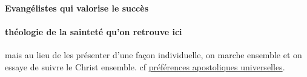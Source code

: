 \paragraph{Evangélistes qui valorise le succès}

\paragraph{théologie de la sainteté qu'on retrouve ici} mais au lieu de les présenter d'une façon individuelle, on marche ensemble et on essaye de suivre le Christ ensemble. cf \href{https://www.jesuites.com/quatre-preferences-apostoliques-universelles-jesuites-dix-prochaines-annees/}{préférences apostoliques universelles}.
